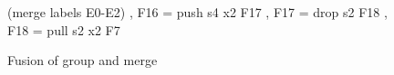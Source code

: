\begin{figure}
\begin{code}
{{  (merge labels E0-E2)
              , F16 = push s4 x2            F17 {}
              , F17 = drop s2               F18 {}
              , F18 = pull s2 x2            F7  {} } }
\end{code}

%
%
%
%
%
%
%

% 
% 
% 
\caption{Fusion of group and merge}
\label{fig:Process:Fused}
\end{figure}



